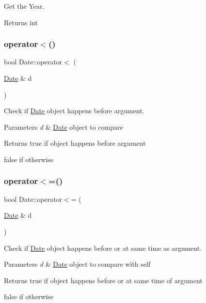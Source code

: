 Get the Year. 

\begin{DoxyReturn}{Returns}
int 
\end{DoxyReturn}
\mbox{\label{classDate_a51d1dadde23783adc9a2ae12d877803c}} 
\subsubsection{\texorpdfstring{operator$<$()}{operator<()}}
{\footnotesize\ttfamily bool Date\+::operator$<$ (\begin{DoxyParamCaption}\item[{\mbox{\hyperlink{classDate}{Date}} \&}]{d }\end{DoxyParamCaption})}



Check if \mbox{\hyperlink{classDate}{Date}} object happens before argument. 


\begin{DoxyParams}{Parameters}
{\em d} & \mbox{\hyperlink{classDate}{Date}} object to compare \\
\hline
\end{DoxyParams}
\begin{DoxyReturn}{Returns}
true if object happens before argument 

false if otherwise 
\end{DoxyReturn}
\mbox{\label{classDate_a49b4e0ed6752c928164fd483720423da}} 
\subsubsection{\texorpdfstring{operator$<$=()}{operator<=()}}
{\footnotesize\ttfamily bool Date\+::operator$<$= (\begin{DoxyParamCaption}\item[{\mbox{\hyperlink{classDate}{Date}} \&}]{d }\end{DoxyParamCaption})}



Check if \mbox{\hyperlink{classDate}{Date}} object happens before or at same time as argument. 


\begin{DoxyParams}{Parameters}
{\em d} & \mbox{\hyperlink{classDate}{Date}} object to compare with self \\
\hline
\end{DoxyParams}
\begin{DoxyReturn}{Returns}
true if object happens before or at same time of argument 

false if otherwise 
\end{DoxyReturn}
\mbox{\label{classDate_a91ccc0361527f5f68785c5460d750a12}} 
